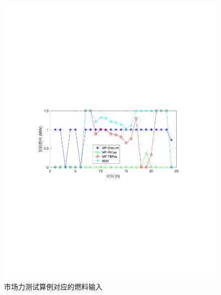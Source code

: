 \begin{figure}[!htp]
\centering
\includegraphics[scale=0.67]{figures/Chap4-14-MPCompGas.pdf}
\caption{市场力测试算例对应的燃料输入}
\label{Fig:MPGasIn}
\end{figure}

